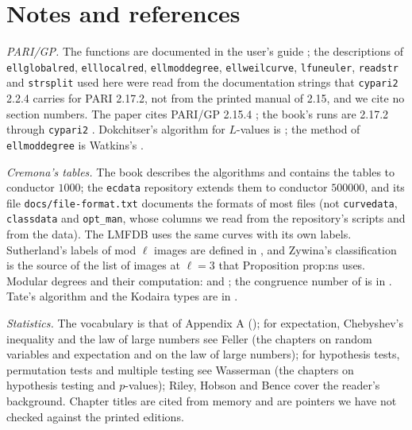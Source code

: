 \begin{sloppypar}
\section{Notes and references}\label{sec:computation:notes}

\emph{PARI/GP.} The functions are documented in the user's guide \cite{PARIusers}; the descriptions of \texttt{ellglobalred}, \texttt{elllocalred},
\texttt{ellmoddegree}, \texttt{ellweilcurve}, \texttt{lfuneuler}, \texttt{readstr} and \texttt{strsplit} used here were read from the documentation strings that
\texttt{cypari2} 2.2.4 carries for PARI 2.17.2, not from the printed manual of 2.15, and we cite no section numbers. The paper cites PARI/GP 2.15.4 \cite{PARI};
the book's runs are 2.17.2 \cite{PARI217} through \texttt{cypari2} \cite{cypari2}. Dokchitser's algorithm for $L$-values is \cite{Dokchitser04}; the method of
\texttt{ellmoddegree} is Watkins's \cite{Watkins02}.

\emph{Cremona's tables.} The book \cite{Cremona97} describes the algorithms and contains the tables to conductor $1000$; the \texttt{ecdata} repository
\cite{ecdata} extends them to conductor $500000$, and its file \texttt{docs/\allowbreak file-format.txt} documents the formats of most files (not
\texttt{curvedata}, \texttt{classdata} and \texttt{opt\_man}, whose columns we read from the repository's scripts and from the data). The LMFDB \cite{LMFDB} uses
the same curves with its own labels. Sutherland's labels of mod $\ell$ images are defined in \cite{Sutherland16}, and Zywina's classification \cite{Zywina15} is
the source of the list of images at $\ell=3$ that Proposition prop:ns uses. Modular degrees and their computation: \cite{Zagier85,Watkins02} and
\cite[Chapter II]{Cremona97}; the congruence number of  is in \cite[Table 1]{ARS12}. Tate's algorithm and the Kodaira types are in
\cite[Chapter IV]{SilvermanATAEC}.

\emph{Statistics.} The vocabulary is that of Appendix A (); for expectation, Chebyshev's inequality and the law of large numbers see
Feller \cite{Feller68} (the chapters on random variables and expectation and on the law of large numbers); for hypothesis tests, permutation tests and
multiple testing see Wasserman \cite{Wasserman04} (the chapters on hypothesis testing and $p$-values); Riley, Hobson and Bence \cite{RHB06} cover the
reader's background. Chapter titles are cited from memory and are pointers we have not checked against the printed editions.


\end{sloppypar}

